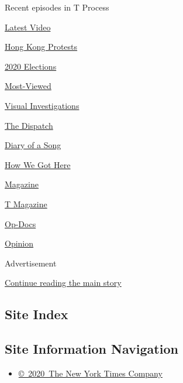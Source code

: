 Recent episodes in T Process

\href{/video}{}

\href{/video/latest-video}{Latest Video}

\href{/video/hk-protest}{Hong Kong Protests}

\href{/video/2020-Elections}{2020 Elections}

\href{/video/Most-Viewed}{Most-Viewed}

\href{/video/investigations}{Visual Investigations}

\href{/video/on-the-ground}{The Dispatch}

\href{/video/diaryofasong}{Diary of a Song}

\href{/video/how-we-got-here}{How We Got Here}

\href{/video/magazine}{Magazine}

\href{/video/t-magazine}{T Magazine}

\href{/video/op-docs}{Op-Docs}

\href{/video/opinion}{Opinion}

Advertisement

\protect\hyperlink{after-bottom}{Continue reading the main story}

\hypertarget{site-index}{%
\subsection{Site Index}\label{site-index}}

\hypertarget{site-information-navigation}{%
\subsection{Site Information
Navigation}\label{site-information-navigation}}

\begin{itemize}
\tightlist
\item
  \href{https://help.nytimes3xbfgragh.onion/hc/en-us/articles/115014792127-Copyright-notice}{©~2020~The
  New York Times Company}
\end{itemize}

